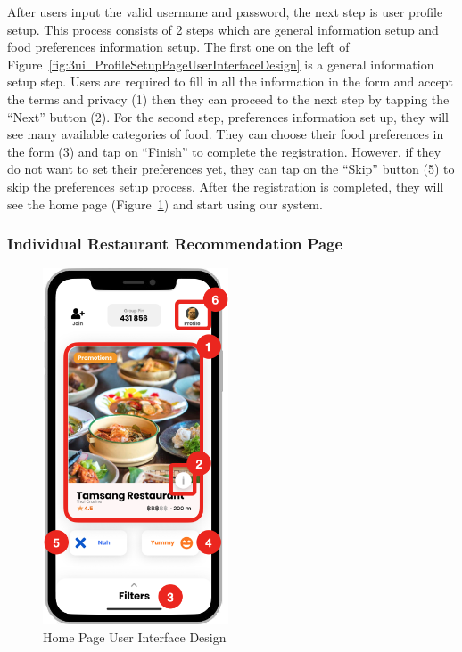 \documentclass[12pt,oneside,openright,a4paper]{cpe-english-project}
\begin{document}
After users input the valid username and password, the next step is user profile setup. This process consists of 2 steps which are general information setup and food preferences information setup. The first one on the left of Figure~\ref{fig:3ui_ProfileSetupPageUserInterfaceDesign} is a general information setup step. Users are required to fill in all the information in the form and accept the terms and privacy (1) then they can proceed to the next step by tapping the “Next” button (2). For the second step, preferences information set up, they will see many available categories of food. They can choose their food preferences in the form (3) and tap on “Finish” to complete the registration. However, if they do not want to set their preferences yet, they can tap on the “Skip” button (5) to skip the preferences setup process. After the registration is completed, they will see the home page (Figure~\ref{fig:3ui_HomePageUserInterfaceDesign}) and start using our system.

\newpage
\subsubsection{Individual Restaurant Recommendation Page}
\begin{figure}[H]\centering
\includegraphics[height=300pt]{./images/3ui_HomePageUserInterfaceDesign.png}
\caption{Home Page User Interface Design}\label{fig:3ui_HomePageUserInterfaceDesign}
\end{figure}\vspace{-24pt}
\end{document}
